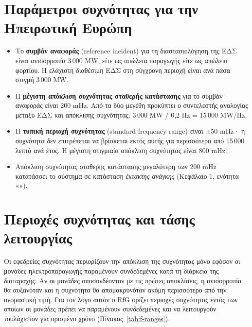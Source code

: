 \section{Παράμετροι συχνότητας για την Ηπειρωτική Ευρώπη}
\label{sec:ce-params}

\begin{itemize}
\item Το \textbf{συμβάν αναφοράς} (reference incident) για τη διαστασιολόγηση της ΕΔΣ είναι
      ανισορροπία 3\,000 MW, είτε ως απώλεια παραγωγής είτε ως απώλεια φορτίου. Η ελάχιστη
      διαθέσιμη ΕΔΣ στη σύγχρονη περιοχή είναι ανά πάσα στιγμή 3\,000 MW.
\item Η \textbf{μέγιστη απόκλιση συχνότητας σταθερής κατάστασης} για το συμβάν αναφοράς
      είναι 200 mHz. Από τα δύο μεγέθη προκύπτει ο συντελεστής αναλογίας μεταξύ ΕΔΣ και
      απόκλισης συχνότητας: 3\,000 MW / 0,2 Hz = 15\,000 MW/Hz.
\item Η \textbf{τυπική περιοχή συχνότητας} (standard frequency range) είναι $\pm 50$ mHz· η
      συχνότητα δεν επιτρέπεται να βρίσκεται εκτός αυτής για περισσότερα από
      15\,000 λεπτά ανά έτος. Η μέγιστη στιγμιαία απόκλιση συχνότητας είναι 800 mHz.
\item Απόκλιση συχνότητας σταθερής κατάστασης μεγαλύτερη των 200 mHz κατατάσσει το σύστημα
      σε κατάσταση \emph{έκτακτης ανάγκης} (Κεφάλαιο 1, ενότητα
      «»).
\end{itemize}

\section{Περιοχές συχνότητας και τάσης λειτουργίας}
\label{sec:f-ranges}

Οι εφεδρείες συχνότητας περιορίζουν την απόκλιση της συχνότητας μόνο εφόσον οι μονάδες
ηλεκτροπαραγωγής παραμένουν συνδεδεμένες κατά τη διάρκεια της διαταραχής. Αν οι μονάδες
αποσυνδέονταν με τις πρώτες αποκλίσεις, η ανισορροπία θα αυξανόταν και η συχνότητα θα
απομακρυνόταν ακόμη περισσότερο από την ονομαστική τιμή. Για τον λόγο αυτόν ο RfG ορίζει περιοχές συχνότητας εντός των οποίων οι μονάδες πρέπει να παραμένουν
συνδεδεμένες και να λειτουργούν τουλάχιστον για ορισμένο χρόνο (Πίνακας~\ref{tab:f-ranges}).

